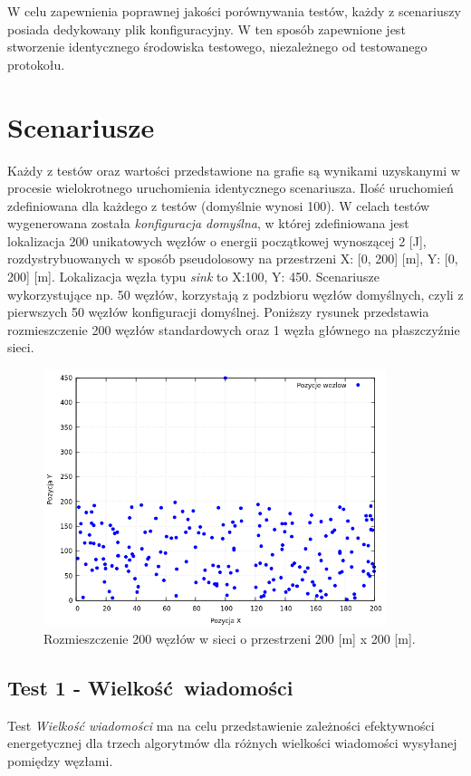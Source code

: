 \documentclass[a4paper,12pt,twoside,openany]{report}
\begin{document}
W celu zapewnienia poprawnej jakości porównywania testów, każdy z scenariuszy posiada dedykowany plik konfiguracyjny.
W ten sposób zapewnione jest stworzenie identycznego środowiska testowego, niezależnego od testowanego protokołu.

\section{Scenariusze}

Każdy z testów oraz wartości przedstawione na grafie są wynikami uzyskanymi w procesie wielokrotnego uruchomienia identycznego scenariusza. 
Ilość uruchomień zdefiniowana dla każdego z testów (domyślnie wynosi 100).
W celach testów wygenerowana została \textit{konfiguracja domyślna}, w której zdefiniowana jest lokalizacja 200 unikatowych węzłów o energii początkowej wynoszącej 2 [J], 
rozdystrybuowanych w sposób pseudolosowy na przestrzeni X: [0, 200] [m], Y: [0, 200] [m]. Lokalizacja węzła typu \textit{sink} to X:100, Y: 450.
Scenariusze wykorzystujące np. 50 węzłów, korzystają z podzbioru węzłów domyślnych, czyli z pierwszych 50 węzłów konfiguracji domyślnej.
Poniższy rysunek przedstawia rozmieszczenie 200 węzłów standardowych oraz 1 węzła głównego na płaszczyźnie sieci.

\begin{figure}[H]
 \centering
 \includegraphics[width=10cm]{images/scenariusz_lokalizacja.png}
 \caption{Rozmieszczenie 200 węzłów w sieci o przestrzeni 200 [m] x 200 [m].}
\end{figure}

\newpage
\subsection{Test 1 - Wielkość wiadomości}

Test \textit{Wielkość wiadomości} ma na celu przedstawienie zależności efektywności energetycznej dla trzech algorytmów dla różnych wielkości wiadomości wysyłanej pomiędzy węzłami.
\end{document}
